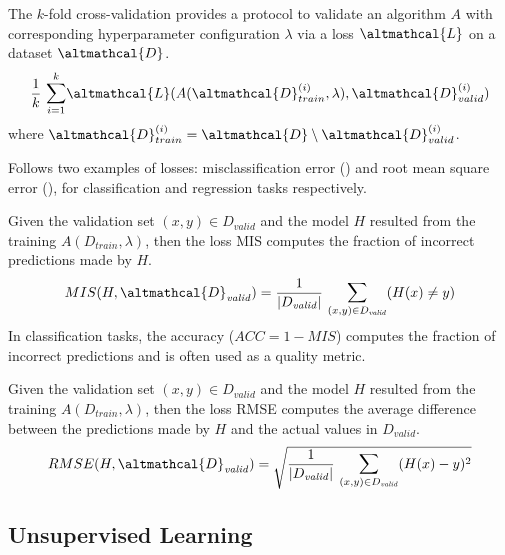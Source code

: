 \documentclass[a4paper,12pt,times,numbered,print,index]{Classes/PhDThesisPSnPDF}
\begin{document}
\begin{definition}
    The $k$-fold cross-validation provides a protocol to validate an algorithm $A$ with corresponding hyperparameter configuration $\lambda$ via a loss $\altmathcal{L}$ on a dataset $\altmathcal{D}$.
    \begin{equation*}
        \frac{1}{k}~\mathlarger{\sum}_{i=1}^{k} \altmathcal{L}(A(\altmathcal{D}_{train}^{(i)}, \lambda), \altmathcal{D}_{valid}^{(i)})
    \end{equation*}
    where $\altmathcal{D}_{train}^{(i)} = \altmathcal{D} \setminus \altmathcal{D}_{valid}^{(i)}$.
\end{definition}

Follows two examples of losses: misclassification error () and root mean square error (), for classification and regression tasks respectively.

\begin{example}\label{ex:misclassification}
    Given the validation set $(x, y) \in D_\mathit{valid}$  and the model $H$ resulted from the training $A(D_\mathit{train}, \lambda)$, then the loss MIS computes the fraction of incorrect predictions made by $H$.
    \begin{equation*}
        MIS(H, \altmathcal{D}_\mathit{valid}) = \frac{1}{|D_\mathit{valid}|}~\mathlarger{\sum}_{(x, y) \in D_\mathit{valid}} (H(x) \ne y)
    \end{equation*}
    In classification tasks, the accuracy ($ACC = 1 - MIS$) computes the fraction of incorrect predictions and is often used as a quality metric.
\end{example}


\begin{example}\label{ex:rmse}
    Given the validation set $(x, y) \in D_\mathit{valid}$  and the model $H$ resulted from the training $A(D_\mathit{train}, \lambda)$, then the loss RMSE computes the average difference between the predictions made by $H$ and the actual values in $D_\mathit{valid}$.
    \begin{equation*}
        RMSE(H, \altmathcal{D}_\mathit{valid}) = \sqrt{\frac{1}{|D_\mathit{valid}|}~\mathlarger{\sum}_{(x, y) \in D_\mathit{valid}} (H(x) - y)^2}
    \end{equation*}
\end{example}

\subsection{Unsupervised Learning}
\end{document}

